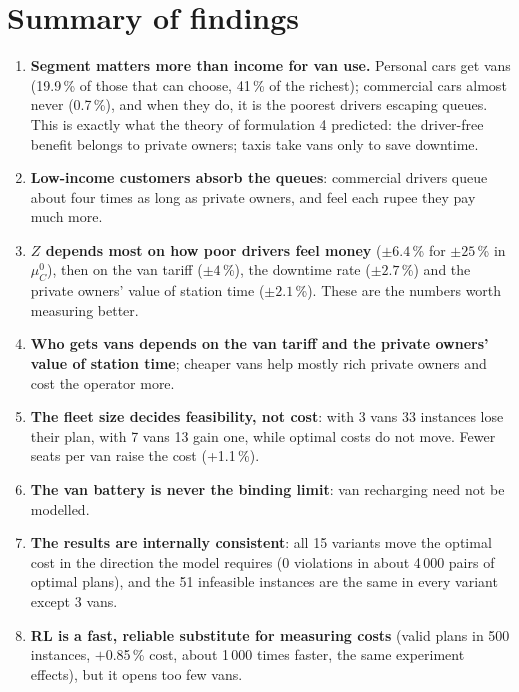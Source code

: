 
\section{Summary of findings}

\begin{enumerate}
  \item \textbf{Segment matters more than income for van use.} Personal cars get vans (19.9\,\% of those that can choose, 41\,\% of the richest); commercial cars almost never (0.7\,\%), and when they do, it is the poorest drivers escaping queues. This is exactly what the theory of formulation 4 predicted: the driver-free benefit belongs to private owners; taxis take vans only to save downtime.
  \item \textbf{Low-income customers absorb the queues}: commercial drivers queue about four times as long as private owners, and feel each rupee they pay much more.
  \item \textbf{$Z$ depends most on how poor drivers feel money} ($\pm6.4$\,\% for $\pm25$\,\% in $\mu^0_C$), then on the van tariff ($\pm4$\,\%), the downtime rate ($\pm2.7$\,\%) and the private owners' value of station time ($\pm2.1$\,\%). These are the numbers worth measuring better.
  \item \textbf{Who gets vans depends on the van tariff and the private owners' value of station time}; cheaper vans help mostly rich private owners and cost the operator more.
  \item \textbf{The fleet size decides feasibility, not cost}: with 3 vans 33 instances lose their plan, with 7 vans 13 gain one, while optimal costs do not move. Fewer seats per van raise the cost (+1.1\,\%).
  \item \textbf{The van battery is never the binding limit}: van recharging need not be modelled.
  \item \textbf{The results are internally consistent}: all 15 variants move the optimal cost in the direction the model requires (0 violations in about 4\,000 pairs of optimal plans), and the 51 infeasible instances are the same in every variant except 3 vans.
  \item \textbf{RL is a fast, reliable substitute for measuring costs} (valid plans in 500 instances, $+$0.85\,\% cost, about 1\,000 times faster, the same experiment effects), but it opens too few vans.
\end{enumerate}

